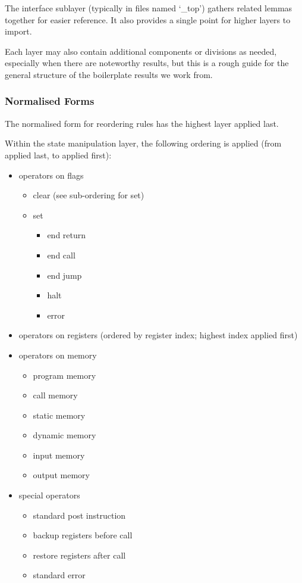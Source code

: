 \documentclass[11pt,a4paper]{article}
\begin{document}
The interface sublayer (typically in files named `\_top') gathers related lemmas together for easier reference. It also provides a single point for higher layers to import.

Each layer may also contain additional components or divisions as needed, especially when there are noteworthy results, but this is a rough guide for the general structure of the boilerplate results we work from.

\subsubsection{Normalised Forms} \label{sec: Normalised Forms}
The normalised form for reordering rules has the highest layer applied last.

Within the state manipulation layer, the following ordering is applied (from applied last, to applied first):
\begin{itemize}
  \item operators on flags 
  \begin{itemize}
    \item clear (see sub-ordering for set)
    \item set 
    \begin{itemize}
      \item end return
      \item end call
      \item end jump
      \item halt
      \item error
    \end{itemize}
  \end{itemize}
  \item operators on registers (ordered by register index; highest index applied first)
  \item operators on memory
  \begin{itemize}
    \item program memory
    \item call memory
    \item static memory
    \item dynamic memory
    \item input memory
    \item output memory
  \end{itemize}
  \item special operators
  \begin{itemize}
    \item standard post instruction
    \item backup registers before call
    \item restore registers after call
    \item standard error
  \end{itemize}
\end{itemize}
\end{document}
